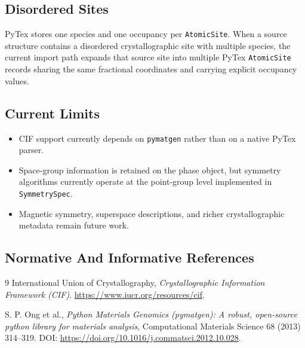 \subsection{Disordered Sites}

PyTex stores one species and one occupancy per \texttt{AtomicSite}. When a source structure contains a disordered crystallographic site with multiple species, the current import path expands that source site into multiple PyTex \texttt{AtomicSite} records sharing the same fractional coordinates and carrying explicit occupancy values.

\subsection{Current Limits}

\begin{itemize}
  \item CIF support currently depends on \texttt{pymatgen} rather than on a native PyTex parser.
  \item Space-group information is retained on the phase object, but symmetry algorithms currently operate at the point-group level implemented in \texttt{SymmetrySpec}.
  \item Magnetic symmetry, superspace descriptions, and richer crystallographic metadata remain future work.
\end{itemize}

\subsection{Normative And Informative References}

\begin{thebibliography}{9}
International Union of Crystallography,
\textit{Crystallographic Information Framework (CIF)}.
\url{https://www.iucr.org/resources/cif}.

S. P. Ong et al.,
\textit{Python Materials Genomics (pymatgen): A robust, open-source python library for materials analysis},
Computational Materials Science 68 (2013) 314--319.
DOI: \url{https://doi.org/10.1016/j.commatsci.2012.10.028}.
\end{thebibliography}
